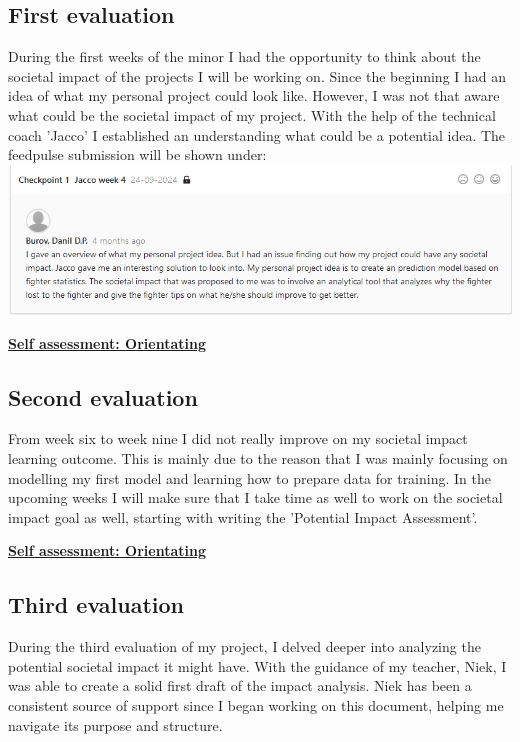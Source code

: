 \documentclass{article}
\begin{document}
	\subsection{First evaluation}
	During the first weeks of the minor I had the opportunity to think about the societal impact of the projects I will 
	be working on. Since the beginning I had an idea of what my personal project could look like. However, I was not that aware
	what could be the societal impact of my project. With the help of the technical coach 'Jacco' I established an understanding what
  could be a potential idea. The feedpulse submission will be shown under:\\
  \includegraphics[width=\textwidth,keepaspectratio]{images/Feedback_Societal_Impact.png}
	
	\underline{\textbf{Self assessment: Orientating}}
	
	\subsection{Second evaluation}
	From week six to week nine I did not really improve on my societal impact learning outcome. This is mainly due to the reason that 
	I was mainly focusing on modelling my first model and learning how to prepare data for training. In the upcoming weeks I will make sure that 
	I take time as well to work on the societal impact goal as well, starting with writing the 'Potential Impact Assessment'.
	
	\underline{\textbf{Self assessment: Orientating}}
	
	\subsection{Third evaluation}
	During the third evaluation of my project, I delved deeper into analyzing the potential societal impact it might have. With the guidance of my teacher, Niek, I was able to create a solid first draft of the impact analysis. Niek has been a consistent source of support since I began working on this document, helping me navigate its purpose and structure.\\
	
\end{document}
